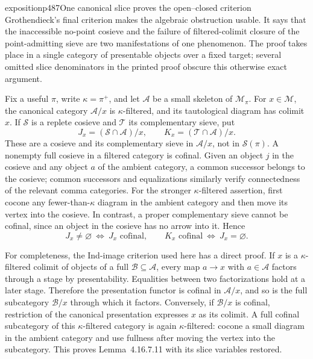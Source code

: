 \begin{dcomment}{exposition}{p487}{One canonical slice proves the open--closed criterion}
Grothendieck's final criterion makes the algebraic obstruction usable. It says that the inaccessible no-point cosieve and the failure of filtered-colimit closure of the point-admitting sieve are two manifestations of one phenomenon. The proof takes place in a single category of presentable objects over a fixed target; several omitted slice denominators in the printed proof obscure this otherwise exact argument.

Fix a useful $\pi$, write $\kappa=\pi^+$, and let $\mathcal A$ be a small skeleton of $\mathcal M_\pi$. For $x\in\mathcal M$, the canonical category $\mathcal A/x$ is $\kappa$-filtered, and its tautological diagram has colimit $x$. If $\mathcal S$ is a replete cosieve and $\mathcal T$ its complementary sieve, put
\[
 J_x=(\mathcal S\cap\mathcal A)/x,
 \qquad K_x=(\mathcal T\cap\mathcal A)/x.
\]
These are a cosieve and its complementary sieve in $\mathcal A/x$, not in $\mathcal S(\pi)$. A nonempty full cosieve in a filtered category is cofinal. Given an object $j$ in the cosieve and any object $a$ of the ambient category, a common successor belongs to the cosieve; common successors and equalizations similarly verify connectedness of the relevant comma categories. For the stronger $\kappa$-filtered assertion, first cocone any fewer-than-$\kappa$ diagram in the ambient category and then move its vertex into the cosieve. In contrast, a proper complementary sieve cannot be cofinal, since an object in the cosieve has no arrow into it. Hence
\[
 J_x\ne\varnothing\ \Longleftrightarrow\ J_x\text{ cofinal},
 \qquad
 K_x\text{ cofinal}\ \Longleftrightarrow\ J_x=\varnothing.
\]

For completeness, the Ind-image criterion used here has a direct proof. If $x$ is a $\kappa$-filtered colimit of objects of a full $\mathcal B\subseteq\mathcal A$, every map $a\to x$ with $a\in\mathcal A$ factors through a stage by presentability. Equalities between two factorizations hold at a later stage. Therefore the presentation functor is cofinal in $\mathcal A/x$, and so is the full subcategory $\mathcal B/x$ through which it factors. Conversely, if $\mathcal B/x$ is cofinal, restriction of the canonical presentation expresses $x$ as its colimit. A full cofinal subcategory of this $\kappa$-filtered category is again $\kappa$-filtered: cocone a small diagram in the ambient category and use fullness after moving the vertex into the subcategory. This proves Lemma~4.16.7.11 with its slice variables restored.


\end{dcomment}

